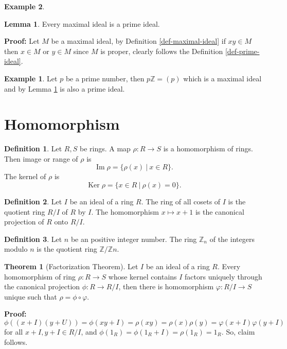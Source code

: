 \documentclass[11pt]{amsbook}%
\theoremstyle{plain}
\theoremstyle{definition}
\newtheorem{definition*}{Definition}
\newtheorem*{example*}{Example}
\newtheorem{lemma}{Lemma}
\newtheorem{theorem}{Theorem}
\numberwithin{equation}{section}
\newcommand{\ZZ}{\mathbb Z}
\renewcommand{\proof}{ \textbf{Proof: }}
\DeclareMathOperator{\Ker}{Ker}
\DeclareMathOperator{\im}{Im}
\begin{document}
\begin{example*}
\begin{lemma}
  \label{lemm-maximal-ideal}
  Every maximal ideal is a prime ideal.
\end{lemma} \vspace{1.8em}
\proof Let $M$ be a maximal ideal, by Definition \ref{def-maximal-ideal} if $xy \in M$ then
$x \in M$ or $y \in M$ since $M$ is proper, clearly follows the Definition \ref{def-prime-ideal}.

\begin{example*}
  Let $p$ be a prime number, then $p\ZZ = (p)$ which is a maximal ideal and by Lemma \ref{lemm-maximal-ideal} is also
  a prime ideal.
\end{example*}

\section{Homomorphism}
\begin{definition*}
  \label{def-homomorphism-ring}
  Let $R, S$ be rings. A map $\rho: R \longrightarrow S$ is a homomorphism of rings. Then image or range of $\rho$ is
  $$
  \im \rho = \{\rho(x) \ | \ x \in R\}.
  $$
  The kernel of $\rho$ is
  $$
  \Ker \rho = \{x \in R \ | \ \rho(x) = 0\}.
  $$
\end{definition*}

\begin{definition*}
  Let $I$ be an ideal of a ring $R$. The ring of all cosets of $I$ is the quotient ring $R/I$ of $R$ by $I$.
  The homomorphism $x \longmapsto x+1$ is the canonical projection of $R$ onto $R/I$.
\end{definition*}

\begin{definition*}
  Let $n$ be an positive integer number. The ring $\ZZ_{n}$ of the integers modulo $n$ is the quotient
  ring $\ZZ/\ZZ n$.
\end{definition*}

\begin{theorem}[Factorization Theorem]
  \label{theo-factorization}
  Let $I$ be an ideal of a ring $R$. Every homomorphism of ring $\rho: R \longrightarrow S$ whose
  kernel contains $I$ factors uniquely through the canonical projection $\phi: R \longrightarrow R/I$, then
  there is homomorphism $\varphi: R/I \longrightarrow S$ unique such that $\rho = \phi \circ \varphi$.
\end{theorem} \vspace{1.8em}
\proof $\phi((x + I)(y + U)) = \phi(xy + I) = \rho(xy) = \rho(x)\rho(y) = \varphi(x + I)\varphi(y + I)$
for all $x + I, y + I \in R/I$, and $\phi(1_{R}) = \phi(1_{R} + I ) = \rho(1_{R}) = 1_{R}$. So, claim follows. \qedsymbol


\end{example*}
\end{document}
